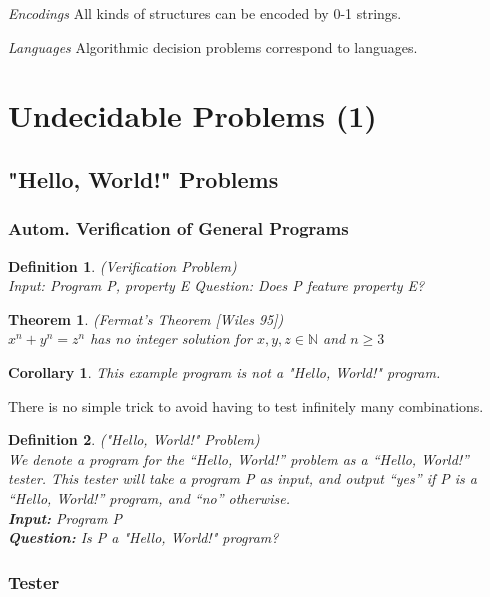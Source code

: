 \documentclass[a3paper, 8pt]{extarticle}
\newtheorem*{theorem*}{Theorem}
\newtheorem*{corollary*}{Corollary}
\newtheorem*{definition}{Definition}
\begin{document}
\begin{multicols*}{6}
\textit{Encodings} All kinds of structures can be encoded by 0-1 strings.

\textit{Languages}
Algorithmic decision problems correspond to languages.

\section{Undecidable Problems (1)}

\subsection{"Hello, World!" Problems}

\subsubsection{Autom. Verification of General Programs}
\begin{definition}
     (Verification Problem)\\
     Input: Program P, property E
     Question: Does P feature property E?
\end{definition}

\begin{theorem*}
(Fermat's Theorem [Wiles 95])\\
$x^n+y^n=z^n$ has no integer solution for $x,y,z \in \mathbb{N}$ and $n \geq 3$
\end{theorem*}

\begin{corollary*}
This example program is not a "Hello, World!" program.
\end{corollary*}

There is no simple trick to avoid having to test infinitely many combinations.

\begin{definition}
     ("Hello, World!" Problem)\\ We denote a program for the “Hello, World!” problem as a “Hello, World!” tester. This tester will take a program P as input, and output “yes” if P is a “Hello, World!” program, and “no” otherwise.\\
     \textbf{Input:} Program P\\
     \textbf{Question:} Is P a "Hello, World!" program?
\end{definition}

\subsubsection{Tester}


\end{multicols*}
\end{document}
